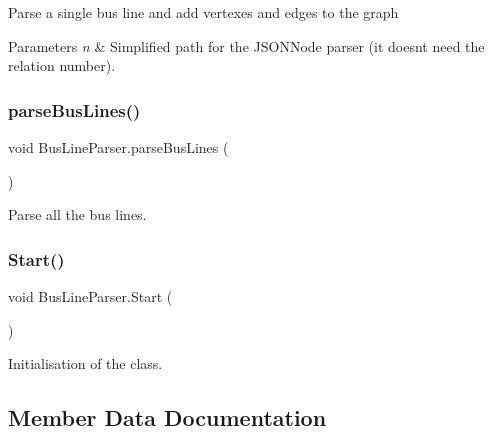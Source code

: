 Parse a single bus line and add vertexes and edges to the graph 


\begin{DoxyParams}{Parameters}
{\em n} & Simplified path for the J\+S\+O\+N\+Node parser (it doesn\textquotesingle{}t need the relation number).\\
\hline
\end{DoxyParams}
\mbox{\label{classBusLineParser_aa441912e091262f0abcea5fd6cc72d5c}} 
\subsubsection{\texorpdfstring{parse\+Bus\+Lines()}{parseBusLines()}}
{\footnotesize\ttfamily void Bus\+Line\+Parser.\+parse\+Bus\+Lines (\begin{DoxyParamCaption}{ }\end{DoxyParamCaption})\hspace{0.3cm}{\ttfamily [inline]}}



Parse all the bus lines. 

\mbox{\label{classBusLineParser_ac9f10220ed1011b9a384f53b792fc35a}} 
\subsubsection{\texorpdfstring{Start()}{Start()}}
{\footnotesize\ttfamily void Bus\+Line\+Parser.\+Start (\begin{DoxyParamCaption}{ }\end{DoxyParamCaption})\hspace{0.3cm}{\ttfamily [inline]}}



Initialisation of the class. 



\subsection{Member Data Documentation}
\mbox{\label{classBusLineParser_a87fba661388bb7e4115b4f73dcb96f6d}} 
